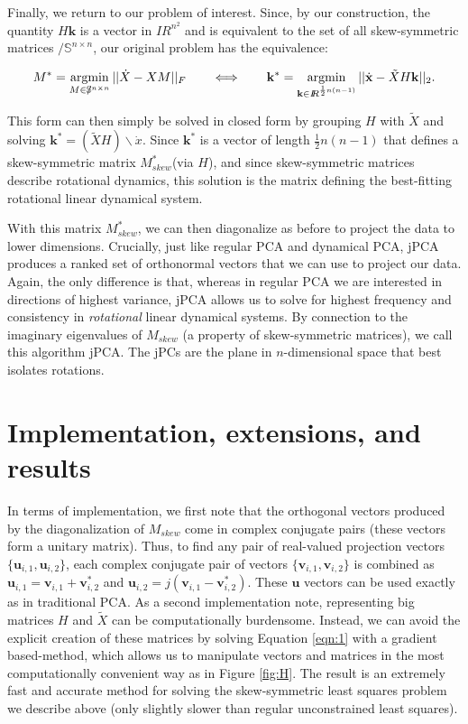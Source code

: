 \documentclass[11pt]{article}%
\def\x{{\mathbf x}}
\def\v{{\mathbf v}}
\def\u{{\mathbf u}}
\def\k{{\mathbf k}}
\newcommand{\reals}{I\!\!R} %
\newcommand{\skewsym}{/\!\!\!\mathbb{S}}
\def\argmin{\qopname\relax n{argmin}}
\begin{document}
Finally, we return to our problem of interest.  Since, by our construction, the quantity $H\k$ is a vector in $\reals^{n^2}$ and is equivalent to the set of all skew-symmetric matrices $\skewsym^{n \times n}$, our original problem has the equivalence:

\begin{equation}
\label{eqn:1}
 M^* = \argmin_{M \in \skewsym^{n \times n}} || \dot X - XM ||_F ~~~~~~ \Longleftrightarrow  ~~~~~~\k^* = \argmin_{\k \in \reals^{\frac{1}{2}n(n-1)}} || \dot \x - \tilde{X}H \k ||_2.
\end{equation}

This form can then simply be solved in closed form by grouping $H$ with $\tilde{X}$ and solving $\k^* = (\tilde{X}H)\backslash \dot x$.  Since $\k^*$ is a vector of length $\frac{1}{2}n(n-1)$ that defines a skew-symmetric matrix $M^*_{skew}$(via $H$), and since skew-symmetric matrices describe rotational dynamics, this solution is the matrix defining the best-fitting rotational linear dynamical system.  

With this matrix  $M_{skew}^*$, we can then diagonalize as before to project the data to lower dimensions.  Crucially, just like regular PCA and dynamical PCA, jPCA produces a ranked set of orthonormal vectors that we can use to project our data.  Again, the only difference is that, whereas in regular PCA we are interested in directions of highest variance, jPCA allows us to solve for highest frequency and consistency in \emph{rotational} linear dynamical systems.  By connection to the imaginary eigenvalues of $M_{skew}$ (a property of skew-symmetric matrices), we call this algorithm jPCA.  The jPCs are the plane in $n$-dimensional space that best isolates rotations. 



\section*{Implementation, extensions, and results}

In terms of implementation, we first note that the orthogonal vectors produced by the diagonalization of $M_{skew}$ come in complex conjugate pairs (these vectors form a unitary matrix).   Thus, to find any pair of real-valued projection vectors $\{\u_{i,1},\u_{i,2}\}$, each complex conjugate pair of vectors $\{\v_{i,1}, \v_{i,2}\}$ is combined as $\u_{i,1} = \v_{i,1}+ \v^*_{i,2}$ and  $\u_{i,2} = j(\v_{i,1} - \v^*_{i,2})$.  These $\u$ vectors can be used exactly as in traditional PCA.  As a second implementation note, representing big matrices $H$ and $\tilde{X}$ can be computationally burdensome.  Instead, we can avoid the explicit creation of these matrices by solving Equation \ref{eqn:1} with a gradient based-method, which allows us to manipulate vectors and matrices in the most computationally convenient way as in Figure \ref{fig:H}.  The result is an extremely fast and accurate method for solving the skew-symmetric least squares problem we describe above (only slightly slower than regular unconstrained least squares).
\end{document}
